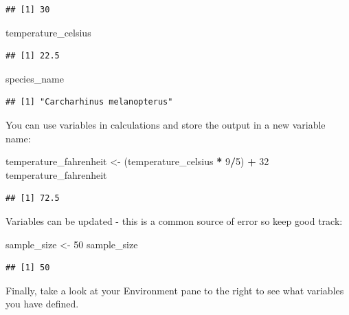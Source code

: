 \documentclass[
]{article}
\newenvironment{Shaded}{\begin{snugshade}}{\end{snugshade}}
\newcommand{\DecValTok}[1]{\textcolor[rgb]{0.00,0.00,0.81}{#1}}
\newcommand{\NormalTok}[1]{#1}
\newcommand{\OtherTok}[1]{\textcolor[rgb]{0.56,0.35,0.01}{#1}}
\newcommand{\SpecialCharTok}[1]{\textcolor[rgb]{0.81,0.36,0.00}{\textbf{#1}}}
\begin{document}
\begin{verbatim}
## [1] 30
\end{verbatim}

\begin{Shaded}
\begin{Highlighting}[]
\NormalTok{temperature\_celsius}
\end{Highlighting}
\end{Shaded}

\begin{verbatim}
## [1] 22.5
\end{verbatim}

\begin{Shaded}
\begin{Highlighting}[]
\NormalTok{species\_name}
\end{Highlighting}
\end{Shaded}

\begin{verbatim}
## [1] "Carcharhinus melanopterus"
\end{verbatim}

You can use variables in calculations and store the output in a new
variable name:

\begin{Shaded}
\begin{Highlighting}[]
\NormalTok{temperature\_fahrenheit }\OtherTok{\textless{}{-}}\NormalTok{ (temperature\_celsius }\SpecialCharTok{*} \DecValTok{9}\SpecialCharTok{/}\DecValTok{5}\NormalTok{) }\SpecialCharTok{+} \DecValTok{32}
\NormalTok{temperature\_fahrenheit}
\end{Highlighting}
\end{Shaded}

\begin{verbatim}
## [1] 72.5
\end{verbatim}

Variables can be updated - this is a common source of error so keep good
track:

\begin{Shaded}
\begin{Highlighting}[]
\NormalTok{sample\_size }\OtherTok{\textless{}{-}} \DecValTok{50}
\NormalTok{sample\_size}
\end{Highlighting}
\end{Shaded}

\begin{verbatim}
## [1] 50
\end{verbatim}

Finally, take a look at your Environment pane to the right to see what
variables you have defined.
\end{document}
